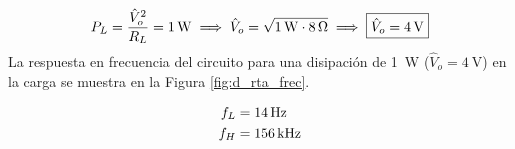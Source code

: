 \begin{equation}
	\centering
	P_L = \frac{ {\hat{V}_o}^{2} }{R_L} = \SI{1}{\watt} \implies \hat{V}_o = \sqrt{\SI{1}{\watt} \cdot \SI{8}{\ohm}} \implies \boxed{\hat{V}_o = \SI{4}{\volt}}
\end{equation}
La respuesta en frecuencia del circuito para una disipación de \SI{1}{\watt} ($\hat{V}_o = \SI{4}{\volt}$) en la carga se muestra en la Figura \ref{fig:d_rta_frec}.




\begin{align}
	\centering
	f_{L} & = \SI{14}{\hertz}\\
	f_H & = \SI{156}{\kilo\hertz}
\end{align}
